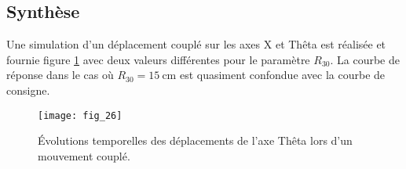 \subsection{Synthèse}

Une simulation d'un déplacement couplé sur les axes X et Thêta est réalisée et fournie figure \ref{fig:CCS_TSI_2021_fig_26} avec deux valeurs différentes pour le paramètre $R_{30}$. La courbe de réponse dans le cas où $R_{30}=15 \mathrm{~cm}$ est quasiment confondue avec la courbe de consigne.

\begin{figure}
\centering
\texttt{[image: fig\_26]}

\caption{\label{fig:CCS_TSI_2021_fig_26}Évolutions temporelles des déplacements de l'axe Thêta lors d'un mouvement couplé.}
\end{figure}

%

